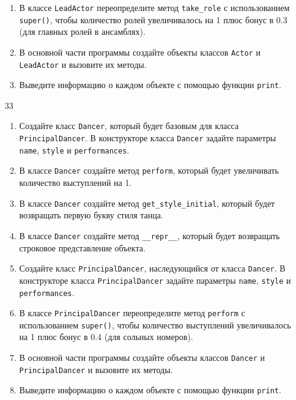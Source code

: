 \begin{enumerate}
\begin{enumerate}
    \item В классе \texttt{LeadActor} переопределите метод \texttt{take\_role} с использованием \texttt{super()}, чтобы количество ролей увеличивалось на 1 плюс бонус в 0.3 (для главных ролей в ансамблях).
    
    \item В основной части программы создайте объекты классов \texttt{Actor} и \texttt{LeadActor} и вызовите их методы.
    
    \item Выведите информацию о каждом объекте с помощью функции \texttt{print}.
\end{enumerate}

\item[33] 
\begin{enumerate}
    \item Создайте класс \texttt{Dancer}, который будет базовым для класса \texttt{PrincipalDancer}. В конструкторе класса \texttt{Dancer} задайте параметры \texttt{name}, \texttt{style} и \texttt{performances}.
    
    \item В классе \texttt{Dancer} создайте метод \texttt{perform}, который будет увеличивать количество выступлений на 1.
    
    \item В классе \texttt{Dancer} создайте метод \texttt{get\_style\_initial}, который будет возвращать первую букву стиля танца.
    
    \item В классе \texttt{Dancer} создайте метод \texttt{\_\_repr\_\_}, который будет возвращать строковое представление объекта.
    
    \item Создайте класс \texttt{PrincipalDancer}, наследующийся от класса \texttt{Dancer}. В конструкторе класса \texttt{PrincipalDancer} задайте параметры \texttt{name}, \texttt{style} и \texttt{performances}.
    
    \item В классе \texttt{PrincipalDancer} переопределите метод \texttt{perform} с использованием \texttt{super()}, чтобы количество выступлений увеличивалось на 1 плюс бонус в 0.4 (для сольных номеров).
    
    \item В основной части программы создайте объекты классов \texttt{Dancer} и \texttt{PrincipalDancer} и вызовите их методы.
    
    \item Выведите информацию о каждом объекте с помощью функции \texttt{print}.
\end{enumerate}


\end{enumerate}
